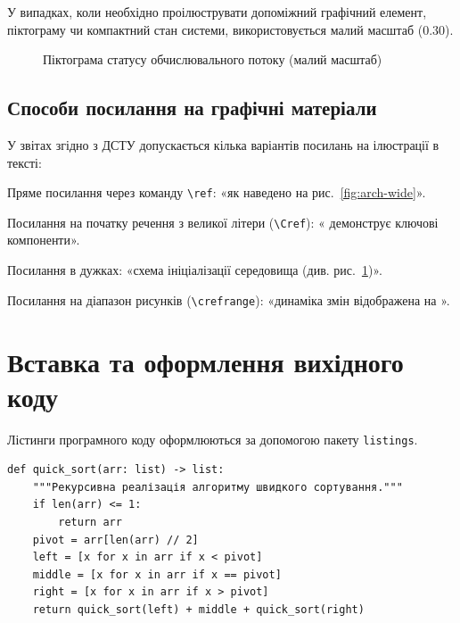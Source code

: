 У випадках, коли необхідно проілюструвати допоміжний графічний елемент, піктограму чи компактний стан системи, використовується малий масштаб (0.30).

\begin{figure}[H]
    \centering
    \caption{Піктограма статусу обчислювального потоку (малий масштаб)}
    \label{fig:icon-small}
\end{figure}

\subsection{Способи посилання на графічні матеріали}
\label{subsec:image-refs}

У звітах згідно з ДСТУ допускається кілька варіантів посилань на ілюстрації в тексті:
\begin{dashlist}[wide,beginpenalty=10000]
    \item Пряме посилання через команду \texttt{\textbackslash ref}: «як наведено на рис.~\ref{fig:arch-wide}».
    \item Посилання на початку речення з великої літери (\texttt{\textbackslash Cref}): « демонструє ключові компоненти».
    \item Посилання в дужках: «схема ініціалізації середовища (див. рис.~\ref{fig:icon-small})».
    \item Посилання на діапазон рисунків (\texttt{\textbackslash crefrange}): «динаміка змін відображена на ».
\end{dashlist}

\section{Вставка та оформлення вихідного коду}
\label{sec:code-listings}

Лістинги програмного коду оформлюються за допомогою пакету \texttt{listings}.

\begin{lstlisting}[label={lst:quicksort},basicstyle=\ttfamily\small]
def quick_sort(arr: list) -> list:
    """Рекурсивна реалізація алгоритму швидкого сортування."""
    if len(arr) <= 1:
        return arr
    pivot = arr[len(arr) // 2]
    left = [x for x in arr if x < pivot]
    middle = [x for x in arr if x == pivot]
    right = [x for x in arr if x > pivot]
    return quick_sort(left) + middle + quick_sort(right)
\end{lstlisting}

